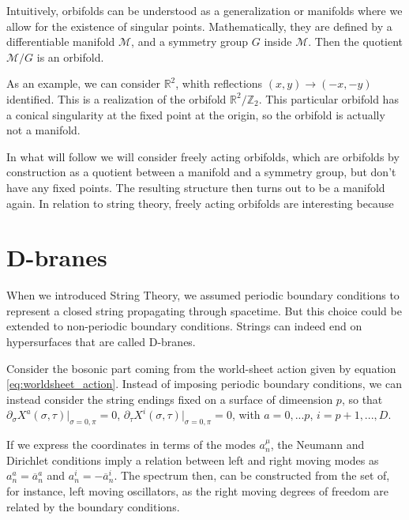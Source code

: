
Intuitively, orbifolds can be understood as a generalization or manifolds where we allow for the existence of singular points. Mathematically, they are defined by a differentiable manifold $\mathcal{M}$, and a symmetry group $G$ inside $\mathcal{M}$. Then the quotient $\mathcal{M}/G$ is an orbifold.

As an example, we can consider $\mathbb{R}^2$, whith reflections $(x,y) \rightarrow (-x,-y)$ identified. This is a realization of the orbifold $\mathbb{R}^2/\mathbb{Z}_2$. This particular orbifold has a conical singularity at the fixed point at the origin, so the orbifold is actually not a manifold.

In what will follow we will consider freely acting orbifolds, which are orbifolds by construction as a quotient between a manifold and a symmetry group, but don't have any fixed points. The resulting structure then turns out to be a manifold again. In relation to string theory, freely acting orbifolds are interesting because %

\section{D-branes}


When we introduced String Theory, we assumed periodic boundary conditions to represent a closed string propagating through spacetime. But this choice could be extended to non-periodic boundary conditions. Strings can indeed end on hypersurfaces that are called D-branes.

Consider the bosonic part coming from the world-sheet action given by equation \ref{eq:worldsheet_action}. Instead of imposing periodic boundary conditions, we can instead consider the string endings fixed on a surface of dimeension $p$, so that $\partial_\sigma X^a(\sigma,\tau)|_{\sigma = 0,\pi} = 0$, $\partial_\tau X^i(\sigma,\tau)|_{\sigma = 0,\pi} = 0$, with $a = 0,...p$, $i=p+1,...,D$.

If we express the coordinates in terms of the modes $a^\mu_n$, the Neumann and Dirichlet conditions imply a relation between left and right moving modes as $a^a_n = \overline{a}^a_n$ and $a^i_n = -\overline{a}^i_n$. The spectrum then, can be constructed from the set of, for instance, left moving oscillators, as the right moving degrees of freedom are related by the boundary conditions.

